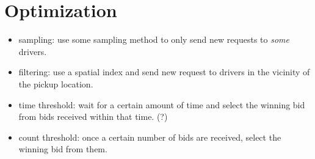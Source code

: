 \section{Optimization}

\begin{itemize}
\item sampling: use some sampling method to only send new requests to \emph{some} drivers.
\item filtering: use a spatial index and send new request to drivers in the vicinity of the pickup location.
\item time threshold: wait for a certain amount of time and select the winning bid from bids received within that time. (?)
\item count threshold: once a certain number of bids are received, select the winning bid from them.
\end{itemize}
